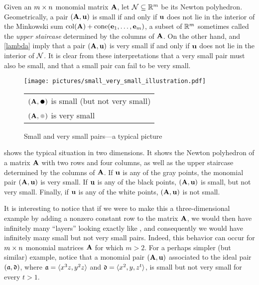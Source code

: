 \documentclass{amsart}
\begin{document}
\begin{remark}
\label{geometric small and very small: R}
Given an $m \times n$ monomial matrix $\mathbf{A}$, let $\mathcal{N} \subseteq \mathbb{R}^{m}$ be its Newton polyhedron.
Geometrically, a pair $(\mathbf{A}, \mathbf{u})$ is small if and only if $\mathbf{u}$ does not lie in the interior of the Minkowski sum $\operatorname{col}(\mathbf{A}) + \operatorname{cone}(\mathbf{e}_1,\ldots,\mathbf{e}_m)$, a subset of $\mathbb{R}^{m}$ sometimes called the \emph{upper staircase} determined by the columns of $\mathbf{A}$.
On the other hand,  and \ref{lambda} imply that a pair $(\mathbf{A}, \mathbf{u})$ is very small if and only if $\mathbf{u}$ does not lie in the interior of $\mathcal{N}$.
It is clear from these interpretations that a very small pair must also be small, and that a small pair can fail to be very small.
\end{remark}

\begin{example}
   \label{ex: small vs very small}
   \begin{figure}
      \centering
      \texttt{[image: pictures/small\_very\_small\_illustration.pdf]}\\[2mm]
      \begin{tabular}{l}
        $(\matA,\mathbin{\vcenter{\hbox{\scalebox{1.5}{$\bullet$}}}})$ is small (but not very small)\\[1mm]
        $(\matA,\textcolor{lightgray}{\mathbin{\vcenter{\hbox{\scalebox{1.5}{$\bullet$}}}}})$ is very small
      \end{tabular}                                                              
      \caption{Small and very small pairs---a typical picture}
      \label{fig: small vs very small}
   \end{figure}
    shows the typical situation in two dimensions.
   It shows the Newton polyhedron of a matrix $\mathbf{A}$ with two rows and four columns, as well as the upper staircase determined by the columns of $\mathbf{A}$.
   If $\mathbf{u}$ is any of the gray points, the monomial pair $(\mathbf{A},\mathbf{u})$ is very small.
   If $\mathbf{u}$ is any of the black points, $(\mathbf{A},\mathbf{u})$ is small, but not very small.
   Finally, if $\mathbf{u}$ is any of the white points, $(\mathbf{A},\mathbf{u})$ is not small.

   It is interesting to notice that if we were to make this a three-dimensional example by adding a nonzero constant row to the matrix $\mathbf{A}$, we would then have infinitely many ``layers'' looking exactly like , and consequently we would have infinitely many small but not very small pairs.
   Indeed, this behavior can occur for $m \times n$ monomial matrices $\mathbf{A}$ for which $m > 2$.
   For a perhaps simpler (but similar) example, notice that a monomial pair $(\mathbf{A}, \mathbf{u})$ associated to the ideal pair $(\mathfrak{a}, \mathfrak{d})$, where $\mathfrak{a}= \langle x^3 z, y^2z \rangle$ and $\mathfrak{d} = \langle x^2, y, z^t \rangle$, is small but not very small for every $t > 1$.
\end{example}
\end{document}

